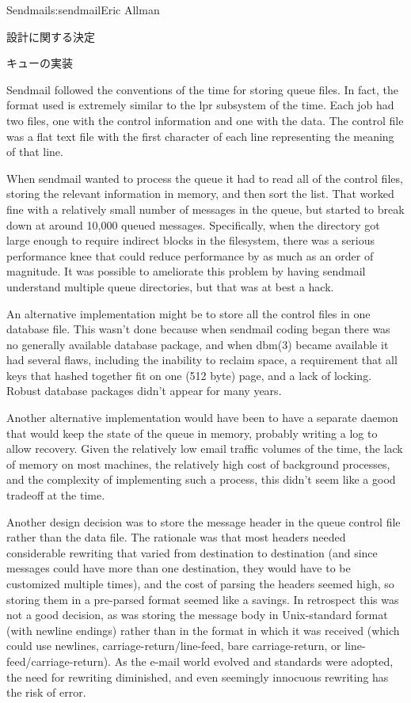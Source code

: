 \begin{aosachapter}{Sendmail}{s:sendmail}{Eric Allman}
\begin{aosasect1}{設計に関する決定}
\begin{aosasect2}{キューの実装}

Sendmail followed the conventions of the time for storing queue files.
In fact, the format used is extremely similar to the lpr subsystem of
the time.  Each job had two files, one with the control information
and one with the data. The control file was a flat text file with the
first character of each line representing the meaning of that line.

When sendmail wanted to process the queue it had to read all of the
control files, storing the relevant information in memory, and then
sort the list. That worked fine with a relatively small number of
messages in the queue, but started to break down at around 10,000
queued messages. Specifically, when the directory got large enough to
require indirect blocks in the filesystem, there was a serious
performance knee that could reduce performance by as much as an order
of magnitude. It was possible to ameliorate this problem by having
sendmail understand multiple queue directories, but that was at best a
hack.

An alternative implementation might be to store all the control files
in one database file. This wasn't done because when sendmail coding
began there was no generally available database package, and when
dbm(3) became available it had several flaws, including the inability
to reclaim space, a requirement that all keys that hashed together fit
on one (512 byte) page, and a lack of locking. Robust database
packages didn't appear for many years.

Another alternative implementation would have been to have a separate
daemon that would keep the state of the queue in memory, probably
writing a log to allow recovery. Given the relatively low email
traffic volumes of the time, the lack of memory on most machines,
the relatively high cost of background processes,
and the complexity of implementing such a process,
this didn't seem
like a good tradeoff at the time.

Another design decision was to store the message header in the queue
control file rather than the data file. The rationale was that most
headers needed considerable rewriting that varied from destination to
destination (and since messages could have more than one destination,
they would have to be customized multiple times), and the cost of
parsing the headers seemed high, so storing them in a pre-parsed
format seemed like a savings. In retrospect this was not a good decision,
as was storing the message body in Unix-standard format (with newline
endings) rather than in the format in which it was received (which
could use newlines, carriage-return/line-feed, bare carriage-return,
or line-feed/carriage-return). As the e-mail world evolved and
standards were adopted, the need for rewriting diminished, and even
seemingly innocuous rewriting has the risk of error.


\end{aosasect2}
\end{aosasect1}
\end{aosachapter}

